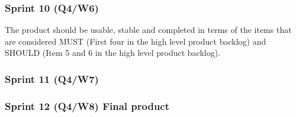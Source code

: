 \documentclass[10pt,a4paper]{report}
\begin{document}
			\subsubsection*{Sprint 10 (Q4/W6)}
				The product should be usable, stable and completed in terms of the items that are considered MUST (First four in the high level product backlog) and SHOULD (Item 5 and 6 in the high level product backlog).
			\subsubsection*{Sprint 11 (Q4/W7)}
			\subsubsection*{Sprint 12 (Q4/W8) Final product}

	\clearpage
\end{document}

